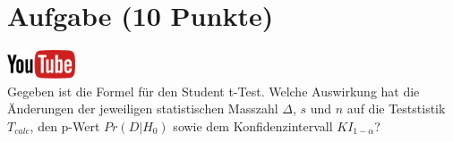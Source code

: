 \documentclass[a4paper, 9pt]{scrartcl}\usepackage[]{graphicx}\usepackage[]{xcolor}
\begin{document}
 
\clearpage

\section{Aufgabe \hfill (10 Punkte)}

\hfill\href{https://youtu.be/bc1m7rkXld4}{\includegraphics[width =
  2cm]{img/youtube}}\\[1Ex]



Gegeben ist die Formel f{\"u}r den Student t-Test. Welche
Auswirkung hat die {\"A}nderungen der jeweiligen statistischen Masszahl
$\Delta$, $s$ und $n$ auf die Teststistik $T_{calc}$, den p-Wert
$Pr(D|H_0)$ sowie dem Konfidenzintervall $KI_{1-\alpha}$?
\end{document}
